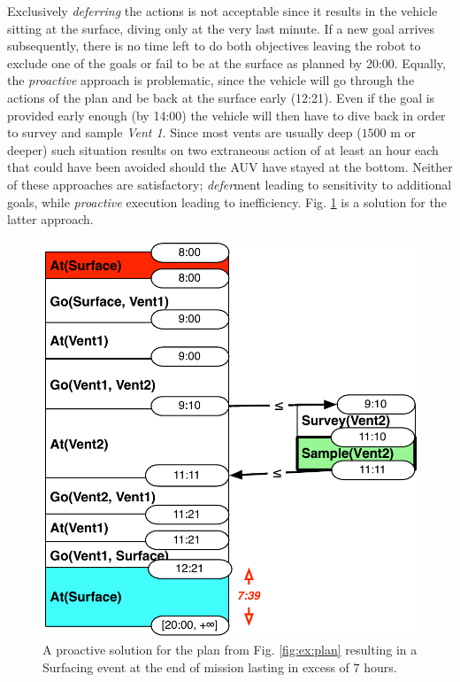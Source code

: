 Exclusively {\em deferring} the actions is not acceptable since it
results in the vehicle sitting at the surface, diving only at the very
last minute. If a new goal arrives subsequently, there is no time left
to do both objectives leaving the robot to exclude one of the goals or
fail to be at the surface as planned by 20:00. Equally, the {\em
  proactive} approach is problematic, since the vehicle will go
through the actions of the plan and be back at the surface early
(12:21). Even if the goal is provided early enough (by 14:00) the
vehicle will then have to dive back in order to survey and sample {\em
  Vent 1}.
Since most vents are usually deep ($1500$ m or deeper) such situation
results on two extraneous action of at least an hour each that could
have been avoided should the AUV have stayed at the bottom.
Neither of these approaches are satisfactory; {\em defer}ment leading 
to sensitivity to additional goals, while \emph{proactive} execution 
leading to inefficiency. Fig. \ref{fig:ex:proactive} is a solution for the latter
approach.



\begin{figure}
  \centering
  \includegraphics[width=0.65\columnwidth]{figs/example_early}
  \caption{\small A proactive solution for the plan from
    Fig. \ref{fig:ex:plan} resulting in a Surfacing event at the end
    of mission lasting in excess of $7$ hours.}
  \label{fig:ex:proactive}
\end{figure}

